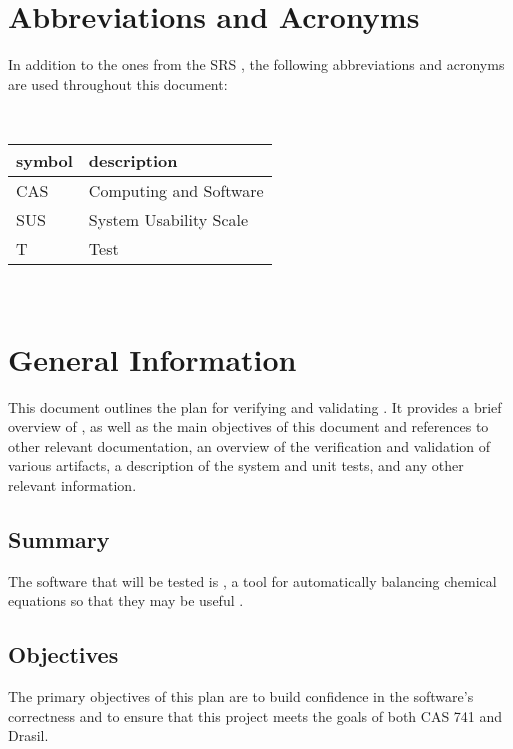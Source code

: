 \documentclass[12pt, titlepage]{article}
\begin{document}
\newpage

\section{Abbreviations and Acronyms} \label{sec_abbrsAcros}

In addition to the ones from the SRS \cite{srs}, the following abbreviations
and acronyms are used throughout this document:

~\newline\noindent
\renewcommand{\arraystretch}{1.2}
\begin{tabular}{l l}
  \toprule
  \textbf{symbol} & \textbf{description}   \\
  \midrule
  CAS             & Computing and Software \\
  SUS             & System Usability Scale \\
  T               & Test                   \\
  \bottomrule
\end{tabular}\\

\newpage


\section{General Information} \label{sec_gen_info}

This document outlines the plan for verifying and validating \progname{}. It
provides a brief overview of \progname{}, as well as the main objectives of
this document and references to other relevant documentation, an overview of
the verification and validation of various artifacts, a description of the
system and unit tests, and any other relevant information.

\subsection{Summary}

The software that will be tested is \progname{}, a tool for automatically
balancing chemical equations so that they may be useful
\cite{lund_introduction_2023}.

\subsection{Objectives}

The primary objectives of this plan are to build confidence in the software's
correctness and to ensure that this project meets the goals of both CAS 741 and
Drasil.
\end{document}
